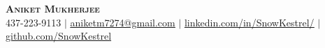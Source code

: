 \begin{center}
	\textbf{\Huge \scshape Aniket Mukherjee} \\ \vspace{5pt}
	\small 437-223-9113 $|$
    \href{aniketm7274@gmail.com}{\underline{aniketm7274@gmail.com}} $|$
	\href{https://www.linkedin.com/in/SnowKestrel/}{\underline{linkedin.com/in/SnowKestrel/}} $|$
	\href{https://github.com/SnowKestrel}{\underline{github.com/SnowKestrel}}
\end{center}
